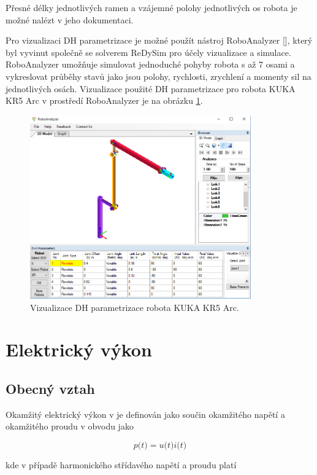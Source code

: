 Přesné délky jednotlivých ramen a vzájemné polohy jednotlivých os robota je možné nalézt v jeho dokumentaci.

Pro vizualizaci DH parametrizace je možné použít nástroj RoboAnalyzer [\cite{roboanalyzer}], který byl vyvinut společně se solverem ReDySim pro účely vizualizace a simulace. RoboAnalyzer umožňuje simulovat jednoduché pohyby robota s až 7 osami a vykreslovat průběhy stavů jako jsou polohy, rychlosti, zrychlení a momenty sil na jednotlivých osách. Vizualizace použité DH parametrizace pro robota KUKA KR5 Arc v prostředí RoboAnalyzer je na obrázku \ref{dh_kuka_pic}.

\begin{figure}[ht]
\includegraphics[width=0.85\textwidth]{pic_dh_kuka}
\caption{Vizualizace DH parametrizace robota KUKA KR5 Arc.}
\label{dh_kuka_pic}
\end{figure}

\section{Elektrický výkon}
\subsection{Obecný vztah}
Okamžitý elektrický výkon v je definován jako součin okamžitého napětí a okamžitého proudu v obvodu jako

\begin{equation}
p\big(t\big) = u\big(t\big)i\big(t\big)
\label{el_power_eq}
\end{equation}

kde v případě harmonického střídavého napětí a proudu platí

